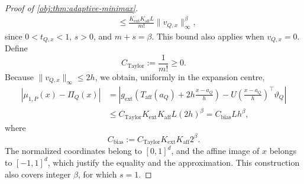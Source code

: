 \begin{proof}[Proof of \cref{obj:thm:adaptive-minimax}]
\[\begin{aligned}
&\le
\frac{K_{\mathrm{ext}}K_{\mathrm{aff}}L}{m!}
\|v_{Q,x}\|_\infty^\beta,
\end{aligned}
\]
since \(0<t_{Q,x}<1\), \(s>0\), and \(m+s=\beta\). This bound also applies when \(v_{Q,x}=0\). Define
\[
C_{\mathrm{Taylor}}:=\frac1{m!}\ge0.
\]
Because \(\|v_{Q,x}\|_\infty\le2h\), we obtain, uniformly in the expansion centre,
\[
\begin{aligned}
|\mu_{1,P}(x)-\Pi_Q(x)|
&=
\left|
g_{\mathrm{ext}}\!\left(
T_{\mathrm{aff}}(a_Q)+2h\frac{x-a_Q}{h}
\right)
-
U\!\left(\frac{x-a_Q}{h}\right)^\top\vartheta_Q
\right|
\\
&\le
C_{\mathrm{Taylor}}K_{\mathrm{ext}}K_{\mathrm{aff}}L(2h)^\beta
=
C_{\mathrm{bias}}Lh^\beta,
\end{aligned}
\]
where
\[
C_{\mathrm{bias}}
:=
C_{\mathrm{Taylor}}K_{\mathrm{ext}}K_{\mathrm{aff}}2^\beta.
\]
The normalized coordinates belong to \([0,1]^d\), and the affine image of \(x\) belongs to \([-1,1]^d\), which justify the equality and the approximation. This construction also covers integer \(\beta\), for which \(s=1\).


\end{proof}
